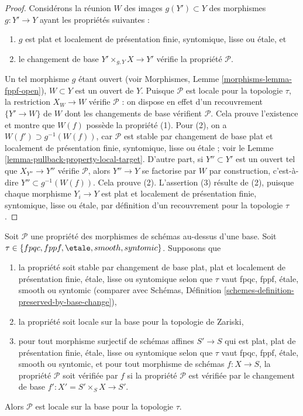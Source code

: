 \begin{proof}
Considérons la réunion $W$ des images $g(Y') \subset Y$ des morphismes
$g : Y' \to Y$ ayant les propriétés suivantes :
\begin{enumerate}
\item $g$ est plat et localement de présentation finie, syntomique, lisse
ou \'etale, et
\item le changement de base $Y' \times_{g, Y} X \to Y'$ vérifie la propriété
$\mathcal{P}$.
\end{enumerate}
Un tel morphisme $g$ étant ouvert (voir Morphismes, Lemme
\ref{morphisms-lemma-fppf-open}), $W \subset Y$ est un ouvert de $Y$.
Puisque $\mathcal{P}$ est locale pour la topologie $\tau$, la restriction
$X_W \to W$ vérifie $\mathcal{P}$ : on dispose en effet d'un recouvrement
$\{Y' \to W\}$ de $W$ dont les changements de base vérifient
$\mathcal{P}$. Cela prouve l'existence et montre que $W(f)$ possède la
propriété (1). Pour (2), on a $W(f') \supset g^{-1}(W(f))$, car
$\mathcal{P}$ est stable par changement de base plat et localement de
présentation finie, syntomique, lisse ou \'etale ; voir le
Lemme \ref{lemma-pullback-property-local-target}. D'autre part, si
$Y'' \subset Y'$ est un ouvert tel que $X_{Y''} \to Y''$ vérifie
$\mathcal{P}$, alors $Y'' \to Y$ se factorise par $W$ par construction,
c'est-à-dire $Y'' \subset g^{-1}(W(f))$. Cela prouve (2). L'assertion (3)
résulte de (2), puisque chaque morphisme $Y_i \to Y$ est plat et localement
de présentation finie, syntomique, lisse ou \'etale, par définition d'un
recouvrement pour la topologie $\tau$.
\end{proof}

\begin{lemma}
\label{lemma-descending-properties-morphisms}
Soit $\mathcal{P}$ une propriété des morphismes de schémas au-dessus d'une
base. Soit $\tau \in \{fpqc, fppf, \etale, smooth, syntomic\}$. Supposons que
\begin{enumerate}
\item la propriété soit stable par changement de base plat, plat et
localement de présentation finie, \'etale, lisse ou syntomique selon que
$\tau$ vaut fpqc, fppf, \'etale, smooth ou syntomic (comparer avec Schémas,
Définition \ref{schemes-definition-preserved-by-base-change}),
\item la propriété soit locale sur la base pour la topologie de Zariski,
\item pour tout morphisme surjectif de schémas affines $S' \to S$ qui est
plat, plat de présentation finie, \'etale, lisse ou syntomique selon que
$\tau$ vaut fpqc, fppf, \'etale, smooth ou syntomic, et pour tout morphisme de
schémas $f : X \to S$, la propriété $\mathcal{P}$ soit vérifiée par $f$ si
la propriété $\mathcal{P}$ est vérifiée par le changement de base
$f' : X' = S' \times_S X \to S'$.
\end{enumerate}
Alors $\mathcal{P}$ est locale sur la base pour la topologie $\tau$.
\end{lemma}

